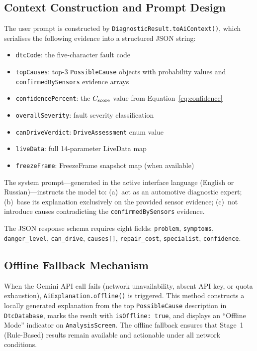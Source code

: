 \subsection{Context Construction and Prompt Design}

The user prompt is constructed by \texttt{DiagnosticResult.toAiContext()}, which serialises the following evidence into a structured JSON string:

\begin{itemize}
  \item \texttt{dtcCode}: the five-character fault code
  \item \texttt{topCauses}: top-3 \texttt{PossibleCause} objects with probability values and \texttt{confirmedBySensors} evidence arrays
  \item \texttt{confidencePercent}: the $C_{\mathrm{score}}$ value from Equation~\ref{eq:confidence}
  \item \texttt{overallSeverity}: fault severity classification
  \item \texttt{canDriveVerdict}: \texttt{DriveAssessment} enum value
  \item \texttt{liveData}: full 14-parameter LiveData map
  \item \texttt{freezeFrame}: FreezeFrame snapshot map (when available)
\end{itemize}

The system prompt---generated in the active interface language (English or Russian)---instructs the model to:
(a)~act as an automotive diagnostic expert;
(b)~base its explanation exclusively on the provided sensor evidence;
(c)~not introduce causes contradicting the \texttt{confirmedBySensors} evidence.

The JSON response schema requires eight fields: \texttt{problem}, \texttt{symptoms}, \texttt{danger\_level}, \texttt{can\_drive}, \texttt{causes[]}, \texttt{repair\_cost}, \texttt{specialist}, \texttt{confidence}.

\subsection{Offline Fallback Mechanism}

When the Gemini API call fails (network unavailability, absent API key, or quota exhaustion), \texttt{AiExplanation.offline()} is triggered.
This method constructs a locally generated explanation from the top \texttt{PossibleCause} description in \texttt{DtcDatabase}, marks the result with \texttt{isOffline: true}, and displays an ``Offline Mode'' indicator on \texttt{AnalysisScreen}.
The offline fallback ensures that Stage~1 (Rule-Based) results remain available and actionable under all network conditions.


